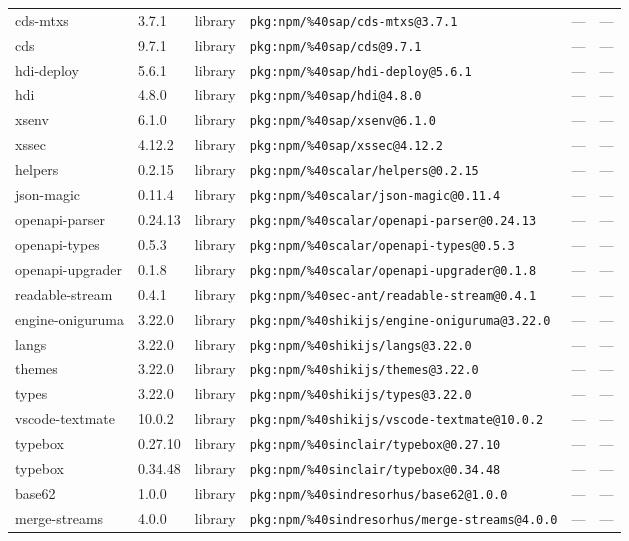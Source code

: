 \documentclass[11pt]{article}
\begin{document}
\begin{longtable}{|l|l|l|p{2.2cm}|l|p{4cm}|}
cds-mtxs & 3.7.1 & library & \texttt{pkg:npm/\%40sap/cds-mtxs@3.7.1} & — & — \\
cds & 9.7.1 & library & \texttt{pkg:npm/\%40sap/cds@9.7.1} & — & — \\
hdi-deploy & 5.6.1 & library & \texttt{pkg:npm/\%40sap/hdi-deploy@5.6.1} & — & — \\
hdi & 4.8.0 & library & \texttt{pkg:npm/\%40sap/hdi@4.8.0} & — & — \\
xsenv & 6.1.0 & library & \texttt{pkg:npm/\%40sap/xsenv@6.1.0} & — & — \\
xssec & 4.12.2 & library & \texttt{pkg:npm/\%40sap/xssec@4.12.2} & — & — \\
helpers & 0.2.15 & library & \texttt{pkg:npm/\%40scalar/helpers@0.2.15} & — & — \\
json-magic & 0.11.4 & library & \texttt{pkg:npm/\%40scalar/json-magic@0.11.4} & — & — \\
openapi-parser & 0.24.13 & library & \texttt{pkg:npm/\%40scalar/openapi-parser@0.24.13} & — & — \\
openapi-types & 0.5.3 & library & \texttt{pkg:npm/\%40scalar/openapi-types@0.5.3} & — & — \\
openapi-upgrader & 0.1.8 & library & \texttt{pkg:npm/\%40scalar/openapi-upgrader@0.1.8} & — & — \\
readable-stream & 0.4.1 & library & \texttt{pkg:npm/\%40sec-ant/readable-stream@0.4.1} & — & — \\
engine-oniguruma & 3.22.0 & library & \texttt{pkg:npm/\%40shikijs/engine-oniguruma@3.22.0} & — & — \\
langs & 3.22.0 & library & \texttt{pkg:npm/\%40shikijs/langs@3.22.0} & — & — \\
themes & 3.22.0 & library & \texttt{pkg:npm/\%40shikijs/themes@3.22.0} & — & — \\
types & 3.22.0 & library & \texttt{pkg:npm/\%40shikijs/types@3.22.0} & — & — \\
vscode-textmate & 10.0.2 & library & \texttt{pkg:npm/\%40shikijs/vscode-textmate@10.0.2} & — & — \\
typebox & 0.27.10 & library & \texttt{pkg:npm/\%40sinclair/typebox@0.27.10} & — & — \\
typebox & 0.34.48 & library & \texttt{pkg:npm/\%40sinclair/typebox@0.34.48} & — & — \\
base62 & 1.0.0 & library & \texttt{pkg:npm/\%40sindresorhus/base62@1.0.0} & — & — \\
merge-streams & 4.0.0 & library & \texttt{pkg:npm/\%40sindresorhus/merge-streams@4.0.0} & — & — \\

\end{longtable}
\end{document}
